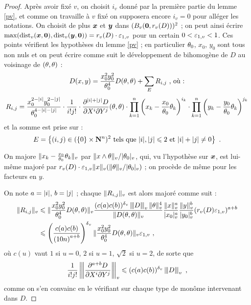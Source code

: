 \documentclass{mpg-preth}
\begin{document}
\begin{proof}
  Après avoir fixé $v$, on choisit $i_v$ donné par la première partie du lemme
  \ref{pv}, et comme on travaille à $v$ fixé on supposera encore $i_v = 0$
  pour alléger les notations. On choisit de plus ${\boldsymbol{x}}$ et ${\boldsymbol{y}}$ dans
  $(B_v({\boldsymbol{0}}, r_v(D)))^2$ ; on peut ainsi écrire $\max(\mathrm{dist}_v({\boldsymbol{x}}, {\boldsymbol{0}}), \mathrm{dist}_v({\boldsymbol{y}}, {\boldsymbol{0}})) = r_v(D)\cdot\varepsilon_{1, v}$ pour un certain $0 < \varepsilon_{1, v} < 1$.
  Ces points vérifient  les hypothèses du lemme \ref{pv} ; en
  particulier $\theta_0$, $x_0$, $y_0$ sont tous non nuls et on peut écrire
  comme suit le développement de  bihomogène de $D$ au voisinage
  de $(\theta, \theta)$ :
  \[
  D(x, y) = \frac{x_0^2y_0^2}{\theta_0^4}D(\theta, \theta) + \sum_E R_{i, j}
  \text{ , où :}
  \]
  \[
  R_{i, j} =
  \frac{x_0^{2-\lvert i\rvert}y_0^{2-\lvert j\rvert}}{\theta_0^{4-\lvert i\rvert-\lvert j\rvert}}\cdot
  \frac{1}{i!j!} \cdot
  \frac{\partial^{\lvert i\rvert+\lvert j\rvert}D}{\partial X^i \partial Y^j}(\theta, \theta)
  \cdot
  \prod_{k=1}^n \left( x_{k} - \frac{x_0}{\theta_0} \theta_{k} \right)^{i_k}
  \cdot \prod_{k=1}^n \left( y_{k} - \frac{y_0}{\theta_0} \theta_{k}
  \right)^{j_k}
  \]
  et la somme est prise sur :
  \[
  E = \left\{ (i, j) \in (\{0\} \times {\mathbf{N}}^n)^2 \text{ tels que }
    \lvert i\rvert,\lvert j\rvert \leqslant 2 \text{ et } \lvert i\rvert+\lvert j\rvert \neq 0 \right\}
  \text{ .}
  \]

  On majore $\lVert x_k - \frac{x_0}{\theta_0} \theta_k\rVert_{v}$ par $\lVert x \wedge
  \theta\rVert_{v}/\lvert\theta_0\rvert_{v}$, qui, vu l'hypothèse sur ${\boldsymbol{x}}$, est lui-même majoré
  par $r_v(D)\cdot\varepsilon_{1, v} \lVert x\rVert_{v} (\lVert\theta\rVert_{v}/\lvert\theta_0\rvert_{v})$ ; on procède de
  même pour les facteurs en $y$.

  On note $a = \lvert i\rvert$, $b=\lvert j\rvert$ ; chaque $\lVert R_{i, j}\rVert_{v}$ est alors majoré
  comme suit :
  \begin{align*}
  \lVert R_{i, j}\rVert_{v} & \leqslant
  \lVert\frac{x_0^2y_0^2}{\theta_0^4}D(\theta, \theta)\rVert_{v}
  \frac{(c(a)c(b))^{\delta\smash{_v}} \left\lvert\hspace{-1pt}\left\lvert\hspace{-1pt} \left\lvert D\right\rvert \hspace{-1pt}\right\rvert\hspace{-1pt}\right\rvert_{v}\lVert\theta\rVert_{v}^4}{\lVert D(\theta, \theta)\rVert_{v}}
  \frac{\lVert x\rVert_{v}^a}{\lvert x_0\rvert_{v}^a} \frac{\lVert y\rVert_{v}^b}{\lvert y_0\rvert_{v}^b} (r_v(D)\varepsilon_{1,
    v})^{a+b}\\
  & \leqslant \left( \frac{c(a)c(b)}{\left( 10n \right)^{a+b}} \right)^{\delta\smash{_v}}
  \lVert\frac{x_0^2y_0^2}{\theta_0^4}D(\theta, \theta)\rVert_{v} \varepsilon_{1, v} \text{ ,}
  \end{align*}
  où $c(u)$ vaut $1$ si $u=0$, $2$ si $u=1$, $\sqrt{2}$ si $u=2$, de sorte que
  \[
  \frac{1}{i!j!}\left\lvert\hspace{-1pt}\left\lvert\hspace{-1pt} \left\lvert\frac{\partial^{a+b}D}{\partial X^i \partial Y^j}\right\rvert \hspace{-1pt}\right\rvert\hspace{-1pt}\right\rvert_{v} \leqslant
  (c(a) c(b))^{\delta\smash{_v}} \left\lvert\hspace{-1pt}\left\lvert\hspace{-1pt} \left\lvert D\right\rvert \hspace{-1pt}\right\rvert\hspace{-1pt}\right\rvert_{v}\text{ ,}
  \]
  comme on s'en convainc en le vérifiant sur chaque type de monôme intervenant
  dans $D$.


\end{proof}
\end{document}

